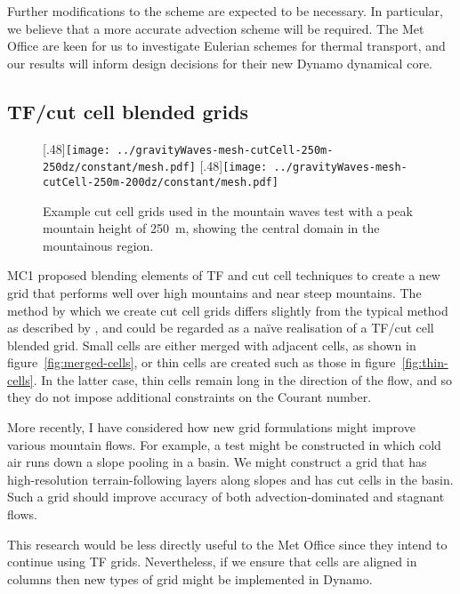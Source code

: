\documentclass[a4paper]{article}
\begin{document}
Further modifications to the scheme are expected to be necessary.  In particular, we believe that a more accurate advection scheme will be required.  The Met Office are keen for us to investigate Eulerian schemes for thermal transport, and our results will inform design decisions for their new Dynamo dynamical core.  

\subsection*{TF/cut cell blended grids}
\begin{figure}
	\centering
	[.48\linewidth]{\texttt{[image: ../gravityWaves-mesh-cutCell-250m-250dz/constant/mesh.pdf]}}
	[.48\linewidth]{\texttt{[image: ../gravityWaves-mesh-cutCell-250m-200dz/constant/mesh.pdf]}}
%
	\caption{Example cut cell grids used in the mountain waves test with a peak mountain height of \SI{250}{\meter}, showing the central domain in the mountainous region.}
	\label{fig:cutCell-grids}
\end{figure}
MC1 proposed blending elements of TF and cut cell techniques to create a new grid that performs well over high mountains and near steep mountains.
The method by which we create cut cell grids differs slightly from the typical method as described by \citet{adcroft1997}, and could be regarded as a na\"{i}ve realisation of a TF/cut cell blended grid.  Small cells are either merged with adjacent cells, as shown in figure~\ref{fig:merged-cells}, or thin cells are created such as those in figure~\ref{fig:thin-cells}.  In the latter case, thin cells remain long in the direction of the flow, and so they do not impose additional constraints on the Courant number.  

More recently, I have considered how new grid formulations might improve various mountain flows.  For example, a test might be constructed in which cold air runs down a slope pooling in a basin.  We might construct a grid that has high-resolution terrain-following layers along slopes and has cut cells in the basin.  Such a grid should improve accuracy of both advection-dominated and stagnant flows.

This research would be less directly useful to the Met Office since they intend to continue using TF grids.  Nevertheless, if we ensure that cells are aligned in columns then new types of grid might be implemented in Dynamo.
\end{document}
